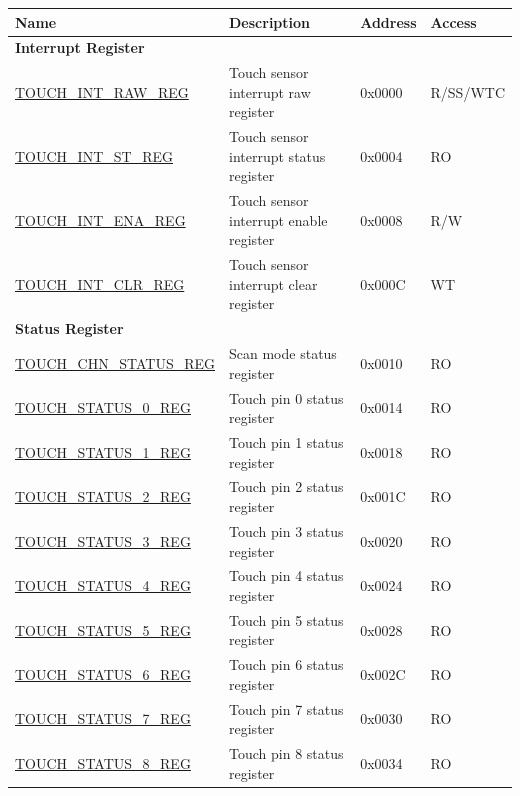 \begin{longtable}{ | l | p{7.2cm} | p{1.3cm} | p{1.7cm} | }
\hline\rowcolor{lightgray}
\textbf{Name} & \textbf{Description} &  \textbf{Address} & \textbf{Access} \\ \hline
\endhead
\multicolumn{4}{|l|}{\textbf{Interrupt Register}} \\ \hline
\hyperref[regdesc:TOUCHINTRAWREG]{TOUCH\_INT\_RAW\_REG} & Touch sensor interrupt raw register & 0x0000 & R/SS/WTC \\ \hline
\hyperref[regdesc:TOUCHINTSTREG]{TOUCH\_INT\_ST\_REG} & Touch sensor interrupt status register & 0x0004 & RO \\ \hline
\hyperref[regdesc:TOUCHINTENAREG]{TOUCH\_INT\_ENA\_REG} & Touch sensor interrupt enable register & 0x0008 & R/W \\ \hline
\hyperref[regdesc:TOUCHINTCLRREG]{TOUCH\_INT\_CLR\_REG} & Touch sensor interrupt clear register & 0x000C & WT \\ \hline
\multicolumn{4}{|l|}{\textbf{Status Register}} \\ \hline
\hyperref[regdesc:TOUCHCHNSTATUSREG]{TOUCH\_CHN\_STATUS\_REG} & Scan mode status register & 0x0010 & RO \\ \hline
\hyperref[regdesc:TOUCHSTATUS0REG]{TOUCH\_STATUS\_0\_REG} & Touch pin 0 status register & 0x0014 & RO \\ \hline
\hyperref[regdesc:TOUCHSTATUS0REG]{TOUCH\_STATUS\_1\_REG} & Touch pin 1 status register & 0x0018 & RO \\ \hline
\hyperref[regdesc:TOUCHSTATUS0REG]{TOUCH\_STATUS\_2\_REG} & Touch pin 2 status register & 0x001C & RO \\ \hline
\hyperref[regdesc:TOUCHSTATUS0REG]{TOUCH\_STATUS\_3\_REG} & Touch pin 3 status register & 0x0020 & RO \\ \hline
\hyperref[regdesc:TOUCHSTATUS0REG]{TOUCH\_STATUS\_4\_REG} & Touch pin 4 status register & 0x0024 & RO \\ \hline
\hyperref[regdesc:TOUCHSTATUS0REG]{TOUCH\_STATUS\_5\_REG} & Touch pin 5 status register & 0x0028 & RO \\ \hline
\hyperref[regdesc:TOUCHSTATUS0REG]{TOUCH\_STATUS\_6\_REG} & Touch pin 6 status register & 0x002C & RO \\ \hline
\hyperref[regdesc:TOUCHSTATUS0REG]{TOUCH\_STATUS\_7\_REG} & Touch pin 7 status register & 0x0030 & RO \\ \hline
\hyperref[regdesc:TOUCHSTATUS0REG]{TOUCH\_STATUS\_8\_REG} & Touch pin 8 status register & 0x0034 & RO \\ \hline

\end{longtable}
